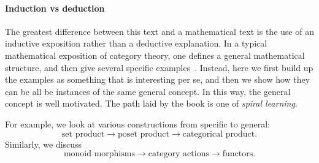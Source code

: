 \paragraph{Induction vs deduction}

The greatest difference between this text and a mathematical text is the use of an inductive exposition rather than a deductive explanation.
In a typical mathematical exposition of category theory, one defines a general mathematical structure, and then give several specific examples~\cite{riehl2017category}.
Instead, here we first build up the examples as something that is interesting per se, and then we show how they can be all be instances of the same general concept.
In this way, the general concept is well motivated.
The path laid by the book is one of \emph{spiral learning}.

For example, we look at various constructions from specific to general:
%
\begin{equation}
    \text{set product}  \rightarrow \text{poset product} \rightarrow \text{categorical product}.
\end{equation}
%
Similarly, we discuss
%
\begin{equation}
    \text{monoid morphisms}  \rightarrow \text{category actions} \rightarrow \text{functors}.
\end{equation}

